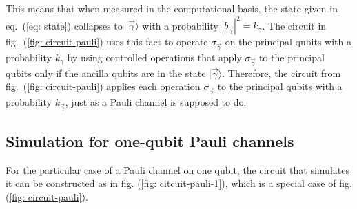 \documentclass[10pt,letterpaper]{article} %
\begin{document}
This means that when measured in the computational basis, the state given in eq.~(\ref{eq: state})
collapses to $|\vec{\gamma}\rangle$ with a 
probability $|b_{\vec{\gamma}}|^2 = k_{\gamma}$. 
The circuit in fig.~(\ref{fig: circuit-pauli}) uses this fact
to operate $\sigma_{\vec{\gamma}}$ on the principal qubits
with a probability $k_{\gamma}$ by using controlled operations 
that apply $\sigma_{\vec{\gamma}}$ to the principal qubits
only if the ancilla qubits are in the state $|\vec{\gamma}\rangle$.
Therefore, the circuit from fig.~(\ref{fig: circuit-pauli}) 
applies each operation $\sigma_{\vec{\gamma}}$ to the principal qubits 
with a probability $k_{\vec{\gamma}}$, 
just as a Pauli channel is supposed to do.  \\

\subsection*{Simulation for one-qubit Pauli channels} %
\label{subsec: Simulation for one-qubit Pauli channels}
For the particular case of a Pauli channel on one qubit, 
the circuit that simulates it can be constructed as in fig. (\ref{fig: citcuit-pauli-1}),
 which is a special case of fig. (\ref{fig: circuit-pauli}).
\end{document}
